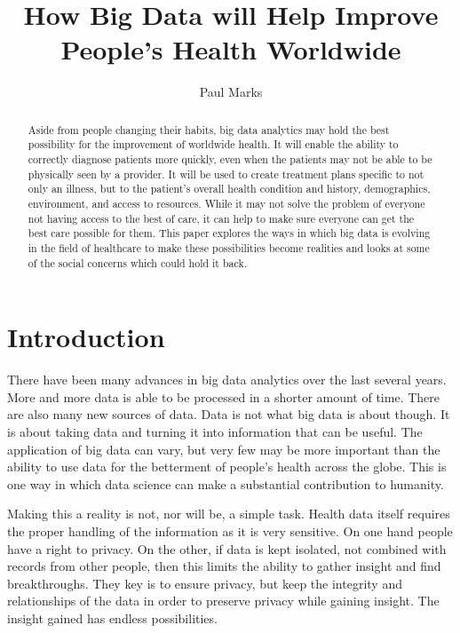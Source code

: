 \documentclass[sigconf]{acmart}
\begin{document}
\title{How Big Data will Help Improve People's Health Worldwide}


\author{Paul Marks}


\begin{abstract}
Aside from people changing their habits, big data analytics
may hold the best possibility for the improvement of
worldwide health.  It will enable the ability to correctly
diagnose patients more quickly, even when the patients may
not be able to be physically seen by a provider.  It will
be used to create treatment plans specific to not only an
illness, but to the patient's overall health condition and
history, demographics, environment, and access to resources.
While it may not solve the problem of everyone not having
access to the best of care, it can help to make sure everyone
can get the best care possible for them.  This paper explores
the ways in which big data is evolving in the field of
healthcare to make these possibilities become realities and
looks at some of the social concerns which could hold it back.
\end{abstract}



\maketitle

\section{Introduction}
There have been many advances in big data analytics over the last 
several years.  More and more data is able to be processed in a 
shorter amount of time.  There are also many new sources of data.  
Data is not what big data is about though.  It is about taking 
data and turning it into information that can be useful.  The 
application of big data can vary, but very few may be more 
important than the ability to use data for the betterment of 
people's health across the globe.  This is one way in which data 
science can make a substantial contribution to humanity.

Making this a reality is not, nor will be, a simple task.  Health 
data itself requires the proper handling of the information as 
it is very sensitive.  On one hand people have a right to privacy.  
On the other, if data is kept isolated, not combined with records 
from other people, then this limits the ability to gather insight 
and find breakthroughs.  They key is to ensure privacy, but keep 
the integrity and relationships of the data in order to preserve 
privacy while gaining insight.  The insight gained has endless 
possibilities.
\end{document}
